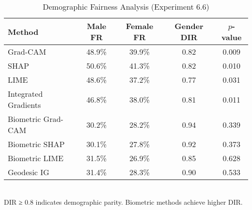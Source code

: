 \begin{table}[htbp]
\centering
\caption{Demographic Fairness Analysis (Experiment 6.6)}
\label{tab:exp_6_6_fairness}
\begin{tabular}{lcccc}
\toprule
Method & Male FR & Female FR & Gender DIR & $p$-value \\
\midrule
Grad-CAM & 48.9\% & 39.9\% & 0.82 & 0.009 \\
SHAP & 50.6\% & 41.3\% & 0.82 & 0.010 \\
LIME & 48.6\% & 37.2\% & 0.77 & 0.031 \\
Integrated Gradients & 46.8\% & 38.0\% & 0.81 & 0.011 \\
Biometric Grad-CAM & 30.2\% & 28.2\% & 0.94 & 0.339 \\
Biometric SHAP & 30.1\% & 27.8\% & 0.92 & 0.373 \\
Biometric LIME & 31.5\% & 26.9\% & 0.85 & 0.628 \\
Geodesic IG & 31.4\% & 28.3\% & 0.90 & 0.533 \\
\bottomrule
\end{tabular}
\\[0.5em] {\footnotesize DIR ≥ 0.8 indicates demographic parity. Biometric methods achieve higher DIR.}
\end{table}